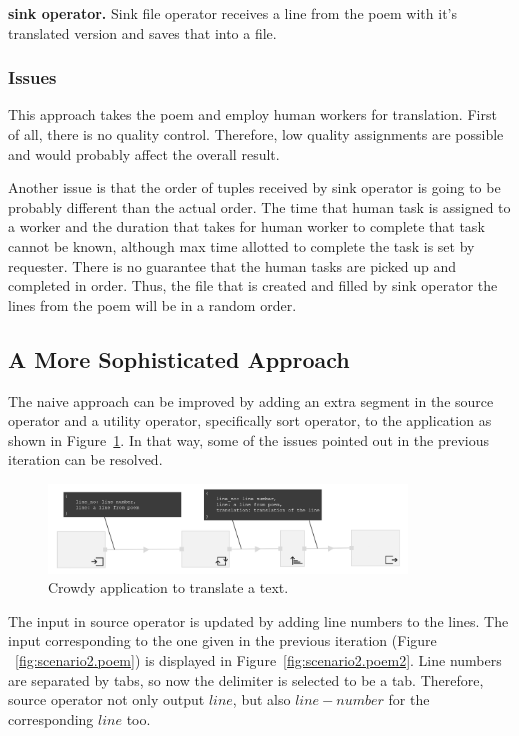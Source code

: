 
\textbf{sink operator.}
Sink file operator receives a line from the poem with it's translated version and saves that into a file.


\subsubsection{Issues}
This approach takes the poem and employ human workers for translation. First of all, there is no quality control. Therefore, low quality assignments are possible and would probably affect the overall result.

Another issue is that the order of tuples received by sink operator is going to be probably different than the actual order. The time that human task is assigned to a worker and the duration that takes for human worker to complete that task cannot be known, although max time allotted to complete the task is set by requester. There is no guarantee that the human tasks are picked up and completed in order. Thus, the file that is created and filled by sink operator the lines from the poem will be in a random order.

\subsection{A More Sophisticated Approach}
The naive approach can be improved by adding an extra segment in the source operator and a utility operator, specifically sort operator, to the application as shown in Figure~\ref{fig:scenario2.1}. In that way, some of the issues pointed out in the previous iteration can be resolved.

\begin{figure}[ht]
	\centering
	\includegraphics[width=0.85\textwidth]{figures/scenarios/scenario2_2a.png}
	\caption{Crowdy application to translate a text.}
	\label{fig:scenario2.1}
\end{figure}

The input in source operator is updated by adding line numbers to the lines. The input corresponding to the one given in the previous iteration (Figure ~\ref{fig:scenario2.poem}) is displayed in Figure~\ref{fig:scenario2.poem2}. Line numbers are separated by tabs, so now the delimiter is selected to be a tab. Therefore, source operator not only output $line$, but also $line-number$ for the corresponding $line$ too.

